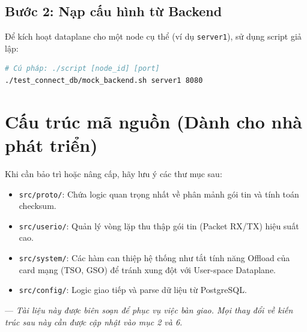 \documentclass[12pt,a4paper]{article}
\begin{document}
\subsection{Bước 2: Nạp cấu hình từ Backend}
Để kích hoạt dataplane cho một node cụ thể (ví dụ \texttt{server1}), sử dụng script giả lập:
\begin{lstlisting}[language=bash]
# Cú pháp: ./script [node_id] [port]
./test_connect_db/mock_backend.sh server1 8080
\end{lstlisting}

\section{Cấu trúc mã nguồn (Dành cho nhà phát triển)}
Khi cần bảo trì hoặc nâng cấp, hãy lưu ý các thư mục sau:
\begin{itemize}
    \item \texttt{src/proto/}: Chứa logic quan trọng nhất về phân mảnh gói tin và tính toán checksum.
    \item \texttt{src/userio/}: Quản lý vòng lặp thu thập gói tin (Packet RX/TX) hiệu suất cao.
    \item \texttt{src/system/}: Các hàm can thiệp hệ thống như tắt tính năng Offload của card mạng (TSO, GSO) để tránh xung đột với User-space Dataplane.
    \item \texttt{src/config/}: Logic giao tiếp và parse dữ liệu từ PostgreSQL.
\end{itemize}

---
\textit{Tài liệu này được biên soạn để phục vụ việc bàn giao. Mọi thay đổi về kiến trúc sau này cần được cập nhật vào mục 2 và 6.}
\end{document}
